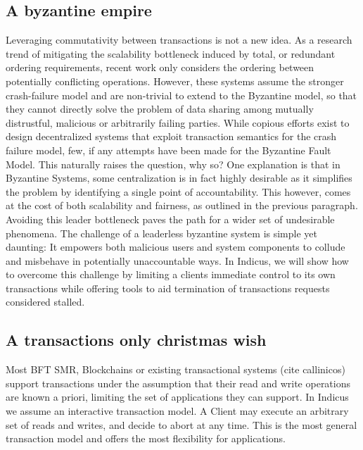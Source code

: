 \subsection{A byzantine empire}
Leveraging commutativity between transactions is not a new idea. As a research trend of mitigating the scalability bottleneck induced by total, or redundant ordering requirements, recent work \cite{moraru2013there, lamport2005generalized, sutra2011fast, li2012redblue, park2019exploiting, yan2018carousel, mu2016consolidating, mu2014extracting, zhang2015tapir, kraska2013mdcc} only considers the ordering between potentially conflicting operations. However, these systems assume the stronger crash-failure model and are non-trivial to extend to the Byzantine model, so that they cannot directly solve the problem of data sharing among mutually distrustful, malicious or arbitrarily failing parties.
While copious efforts exist to design decentralized systems that exploit transaction semantics for the crash failure model, few, if any attempts have been made for the Byzantine Fault Model. This naturally raises the question, why so? One explanation is that in Byzantine Systems, some centralization is in fact highly desirable as it simplifies the problem by identifying a single point of accountability. This however, comes at the cost of both scalability and fairness, as outlined in the previous paragraph.  Avoiding this leader bottleneck paves the path for a wider set of undesirable phenomena. The challenge of a leaderless byzantine system is simple yet daunting: It empowers both malicious users and system components to collude and misbehave in potentially unaccountable ways. 
In Indicus, we will show how to overcome this challenge by limiting a clients immediate control to its own transactions while offering tools to aid termination of transactions requests considered stalled.

\subsection{A transactions only christmas wish}
Most BFT SMR, Blockchains or existing transactional systems (cite callinicos) support transactions under the assumption that their read and write operations are known a priori, limiting the set of applications they can support. In Indicus we assume an interactive transaction model. A Client may execute an arbitrary set of reads and writes, and decide to abort at any time. This is the most general transaction model and offers the most flexibility for applications.

